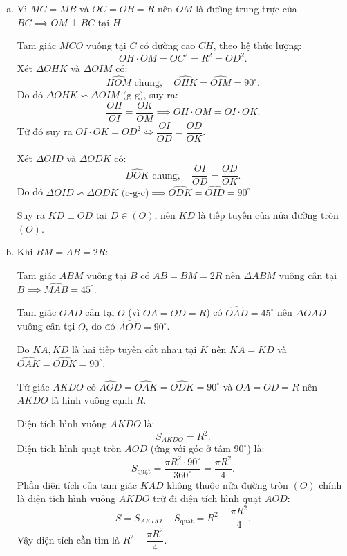 \begin{bt}
{\begin{enumerate}[a)]
			Tứ giác $MCOB$ có $\widehat{MCO} + \widehat{MBO} = 90^\circ + 90^\circ = 180^\circ$, suy ra $MCOB$ nội tiếp đường tròn đường kính $MO$.
			
			Vì $I$ là trung điểm của dây cung $AD$ nên $OI \perp AD \implies \widehat{MIO} = 90^\circ$.
			
			Tứ giác $MCIO$ có $\widehat{MCO} = \widehat{MIO} = 90^\circ$, do đó $C$ và $I$ cùng nhìn đoạn $MO$ dưới góc vuông.
			
			Suy ra $MCIO$ nội tiếp đường tròn đường kính $MO$.
			\item Vì $MC = MB$ và $OC = OB = R$ nên $OM$ là đường trung trực của $BC \implies OM \perp BC$ tại $H$.
			
			Tam giác $MCO$ vuông tại $C$ có đường cao $CH$, theo hệ thức lượng:
			$$OH \cdot OM = OC^2 = R^2 = OD^2.$$
			Xét $\Delta OHK$ và $\Delta OIM$ có:
			$$\widehat{HOM}\text{ chung},\quad \widehat{OHK} = \widehat{OIM} = 90^\circ.$$
			Do đó $\Delta OHK \backsim \Delta OIM\text{ (g-g)}$, suy ra:
			$$\dfrac{OH}{OI} = \dfrac{OK}{OM} \implies OH \cdot OM = OI \cdot OK.$$
			Từ đó suy ra $OI \cdot OK = OD^2 \iff \dfrac{OI}{OD} = \dfrac{OD}{OK}$.
			
			Xét $\Delta OID$ và $\Delta ODK$ có:
			$$\widehat{DOK}\text{ chung},\quad \dfrac{OI}{OD} = \dfrac{OD}{OK}.$$
			Do đó $\Delta OID \backsim \Delta ODK\text{ (c-g-c)} \implies \widehat{ODK} = \widehat{OID} = 90^\circ$.
			
			Suy ra $KD \perp OD$ tại $D \in (O)$, nên $KD$ là tiếp tuyến của nửa đường tròn $(O)$.
			\item Khi $BM = AB = 2R$:
			
			Tam giác $ABM$ vuông tại $B$ có $AB = BM = 2R$ nên $\Delta ABM$ vuông cân tại $B \implies \widehat{MAB} = 45^\circ$.
			
			Tam giác $OAD$ cân tại $O$ (vì $OA = OD = R$) có $\widehat{OAD} = 45^\circ$ nên $\Delta OAD$ vuông cân tại $O$, do đó $\widehat{AOD} = 90^\circ$.
			
			Do $KA, KD$ là hai tiếp tuyến cắt nhau tại $K$ nên $KA = KD$ và $\widehat{OAK} = \widehat{ODK} = 90^\circ$.
			
			Tứ giác $AKDO$ có $\widehat{AOD} = \widehat{OAK} = \widehat{ODK} = 90^\circ$ và $OA = OD = R$ nên $AKDO$ là hình vuông cạnh $R$.
			
			Diện tích hình vuông $AKDO$ là:
			$$S_{AKDO} = R^2.$$
			Diện tích hình quạt tròn $AOD$ (ứng với góc ở tâm $90^\circ$) là:
			$$S_{\text{quạt}} = \dfrac{\pi R^2 \cdot 90^\circ}{360^\circ} = \dfrac{\pi R^2}{4}.$$
			Phần diện tích của tam giác $KAD$ không thuộc nửa đường tròn $(O)$ chính là diện tích hình vuông $AKDO$ trừ đi diện tích hình quạt $AOD$:
			$$S = S_{AKDO} - S_{\text{quạt}} = R^2 - \dfrac{\pi R^2}{4}.$$
			Vậy diện tích cần tìm là $R^2 - \dfrac{\pi R^2}{4}$.
		\end{enumerate}
}
\end{bt}

